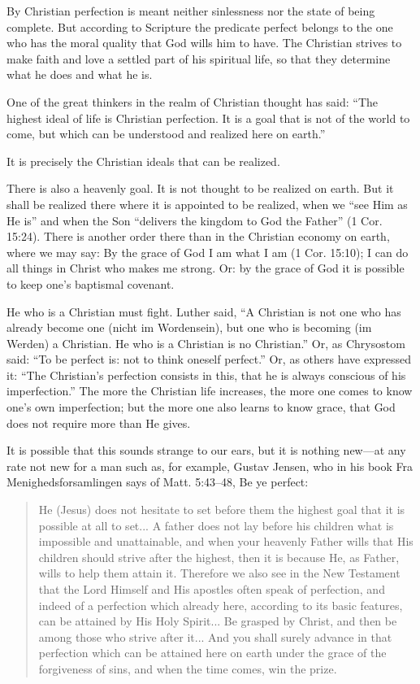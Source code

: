 By Christian perfection is meant neither sinlessness nor the state of being complete. But according to Scripture the predicate perfect belongs to the one who has the moral quality that God wills him to have. The Christian strives to make faith and love a settled part of his spiritual life, so that they determine what he does and what he is.

One of the great thinkers in the realm of Christian thought has said: “The highest ideal of life is Christian perfection. It is a goal that is not of the world to come, but which can be understood and realized here on earth.”

It is precisely the Christian ideals that can be realized.

There is also a heavenly goal. It is not thought to be realized on earth. But it shall be realized there where it is appointed to be realized, when we “see Him as He is” and when the Son “delivers the kingdom to God the Father” (1 Cor. 15:24). There is another order there than in the Christian economy on earth, where we may say: By the grace of God I am what I am (1 Cor. 15:10); I can do all things in Christ who makes me strong. Or: by the grace of God it is possible to keep one’s baptismal covenant.

He who is a Christian must fight. Luther said, “A Christian is not one who has already become one (nicht im Wordensein), but one who is becoming (im Werden) a Christian. He who is a Christian is no Christian.” Or, as Chrysostom said: “To be perfect is: not to think oneself perfect.” Or, as others have expressed it: “The Christian’s perfection consists in this, that he is always conscious of his imperfection.” The more the Christian life increases, the more one comes to know one’s own imperfection; but the more one also learns to know grace, that God does not require more than He gives.

It is possible that this sounds strange to our ears, but it is nothing new—at any rate not new for a man such as, for example, Gustav Jensen, who in his book Fra Menighedsforsamlingen says of Matt. 5:43–48, Be ye perfect:

\begin{quote}
He (Jesus) does not hesitate to set before them the highest goal that it is possible at all to set... A father does not lay before his children what is impossible and unattainable, and when your heavenly Father wills that His children should strive after the highest, then it is because He, as Father, wills to help them attain it. Therefore we also see in the New Testament that the Lord Himself and His apostles often speak of perfection, and indeed of a perfection which already here, according to its basic features, can be attained by His Holy Spirit... Be grasped by Christ, and then be among those who strive after it... And you shall surely advance in that perfection which can be attained here on earth under the grace of the forgiveness of sins, and when the time comes, win the prize.
\end{quote}

